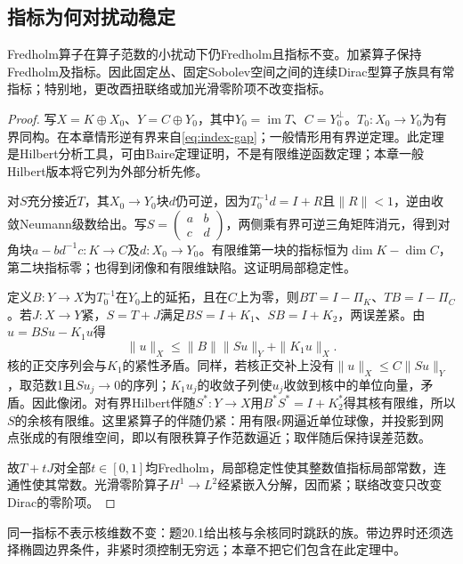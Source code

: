 \subsection{指标为何对扰动稳定}
\begin{proposition}\label{prop:index-stability}
Fredholm算子在算子范数的小扰动下仍Fredholm且指标不变。加紧算子保持Fredholm及指标。因此固定丛、固定Sobolev空间之间的连续Dirac型算子族具有常指标；特别地，更改酉扭联络或加光滑零阶项不改变指标。
\end{proposition}
\begin{proof}
写$X=K\oplus X_0$、$Y=C\oplus Y_0$，其中$Y_0=\operatorname{im}T$、$C=Y_0^\perp$。$T_0:X_0\to Y_0$为有界同构。在本章情形逆有界来自\eqref{eq:index-gap}；一般情形用有界逆定理。此定理是Hilbert分析工具，可由Baire定理证明，不是有限维逆函数定理；本章一般Hilbert版本将它列为外部分析先修。

对$S$充分接近$T$，其$X_0\to Y_0$块$d$仍可逆，因为$T_0^{-1}d=I+R$且$\|R\|<1$，逆由收敛Neumann级数给出。写$S=\left(\begin{smallmatrix}a&b\\c&d\end{smallmatrix}\right)$，两侧乘有界可逆三角矩阵消元，得到对角块$a-bd^{-1}c:K\to C$及$d:X_0\to Y_0$。有限维第一块的指标恒为$\dim K-\dim C$，第二块指标零；也得到闭像和有限维缺陷。这证明局部稳定性。

定义$B:Y\to X$为$T_0^{-1}$在$Y_0$上的延拓，且在$C$上为零，则$BT=I-\Pi_K$、$TB=I-\Pi_C$。若$J:X\to Y$紧，$S=T+J$满足$BS=I+K_1$、$SB=I+K_2$，两误差紧。由$u=BSu-K_1u$得
\[
 \|u\|_X\leq\|B\|\|Su\|_Y+\|K_1u\|_X.
\]
核的正交序列会与$K_1$的紧性矛盾。同样，若核正交补上没有$\|u\|_X\leq C\|Su\|_Y$，取范数1且$Su_j\to0$的序列；$K_1u_j$的收敛子列使$u_j$收敛到核中的单位向量，矛盾。因此像闭。对有界Hilbert伴随$S^*:Y\to X$用$B^*S^*=I+K_2^*$得其核有限维，所以$S$的余核有限维。这里紧算子的伴随仍紧：用有限$\epsilon$网逼近单位球像，并投影到网点张成的有限维空间，即以有限秩算子作范数逼近；取伴随后保持误差范数。

故$T+tJ$对全部$t\in[0,1]$均Fredholm，局部稳定性使其整数值指标局部常数，连通性使其常数。光滑零阶算子$H^1\to L^2$经紧嵌入分解，因而紧；联络改变只改变Dirac的零阶项。
\end{proof}

同一指标不表示核维数不变：题20.1给出核与余核同时跳跃的族。带边界时还须选择椭圆边界条件，非紧时须控制无穷远；本章不把它们包含在此定理中。
